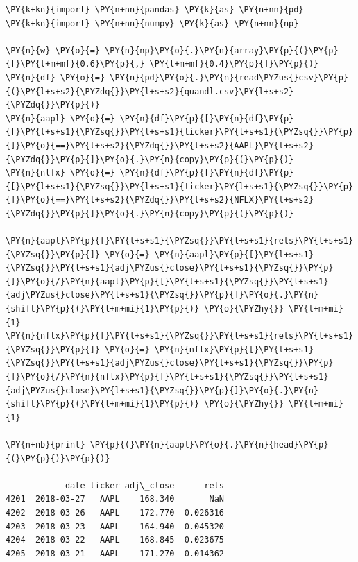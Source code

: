 \begin{tcolorbox}[breakable, size=fbox, boxrule=1pt, pad at break*=1mm,colback=cellbackground, colframe=cellborder]
\begin{Verbatim}[commandchars=\\\{\}]
\PY{k+kn}{import} \PY{n+nn}{pandas} \PY{k}{as} \PY{n+nn}{pd}
\PY{k+kn}{import} \PY{n+nn}{numpy} \PY{k}{as} \PY{n+nn}{np}

\PY{n}{w} \PY{o}{=} \PY{n}{np}\PY{o}{.}\PY{n}{array}\PY{p}{(}\PY{p}{[}\PY{l+m+mf}{0.6}\PY{p}{,} \PY{l+m+mf}{0.4}\PY{p}{]}\PY{p}{)}
\PY{n}{df} \PY{o}{=} \PY{n}{pd}\PY{o}{.}\PY{n}{read\PYZus{}csv}\PY{p}{(}\PY{l+s+s2}{\PYZdq{}}\PY{l+s+s2}{quandl.csv}\PY{l+s+s2}{\PYZdq{}}\PY{p}{)}
\PY{n}{aapl} \PY{o}{=} \PY{n}{df}\PY{p}{[}\PY{n}{df}\PY{p}{[}\PY{l+s+s1}{\PYZsq{}}\PY{l+s+s1}{ticker}\PY{l+s+s1}{\PYZsq{}}\PY{p}{]}\PY{o}{==}\PY{l+s+s2}{\PYZdq{}}\PY{l+s+s2}{AAPL}\PY{l+s+s2}{\PYZdq{}}\PY{p}{]}\PY{o}{.}\PY{n}{copy}\PY{p}{(}\PY{p}{)}
\PY{n}{nlfx} \PY{o}{=} \PY{n}{df}\PY{p}{[}\PY{n}{df}\PY{p}{[}\PY{l+s+s1}{\PYZsq{}}\PY{l+s+s1}{ticker}\PY{l+s+s1}{\PYZsq{}}\PY{p}{]}\PY{o}{==}\PY{l+s+s2}{\PYZdq{}}\PY{l+s+s2}{NFLX}\PY{l+s+s2}{\PYZdq{}}\PY{p}{]}\PY{o}{.}\PY{n}{copy}\PY{p}{(}\PY{p}{)}
		
\PY{n}{aapl}\PY{p}{[}\PY{l+s+s1}{\PYZsq{}}\PY{l+s+s1}{rets}\PY{l+s+s1}{\PYZsq{}}\PY{p}{]} \PY{o}{=} \PY{n}{aapl}\PY{p}{[}\PY{l+s+s1}{\PYZsq{}}\PY{l+s+s1}{adj\PYZus{}close}\PY{l+s+s1}{\PYZsq{}}\PY{p}{]}\PY{o}{/}\PY{n}{aapl}\PY{p}{[}\PY{l+s+s1}{\PYZsq{}}\PY{l+s+s1}{adj\PYZus{}close}\PY{l+s+s1}{\PYZsq{}}\PY{p}{]}\PY{o}{.}\PY{n}{shift}\PY{p}{(}\PY{l+m+mi}{1}\PY{p}{)} \PY{o}{\PYZhy{}} \PY{l+m+mi}{1}
\PY{n}{nflx}\PY{p}{[}\PY{l+s+s1}{\PYZsq{}}\PY{l+s+s1}{rets}\PY{l+s+s1}{\PYZsq{}}\PY{p}{]} \PY{o}{=} \PY{n}{nflx}\PY{p}{[}\PY{l+s+s1}{\PYZsq{}}\PY{l+s+s1}{adj\PYZus{}close}\PY{l+s+s1}{\PYZsq{}}\PY{p}{]}\PY{o}{/}\PY{n}{nflx}\PY{p}{[}\PY{l+s+s1}{\PYZsq{}}\PY{l+s+s1}{adj\PYZus{}close}\PY{l+s+s1}{\PYZsq{}}\PY{p}{]}\PY{o}{.}\PY{n}{shift}\PY{p}{(}\PY{l+m+mi}{1}\PY{p}{)} \PY{o}{\PYZhy{}} \PY{l+m+mi}{1}

\PY{n+nb}{print} \PY{p}{(}\PY{n}{aapl}\PY{o}{.}\PY{n}{head}\PY{p}{(}\PY{p}{)}\PY{p}{)}

            date ticker adj\_close      rets
4201  2018-03-27   AAPL    168.340       NaN
4202  2018-03-26   AAPL    172.770  0.026316
4203  2018-03-23   AAPL    164.940 -0.045320
4204  2018-03-22   AAPL    168.845  0.023675
4205  2018-03-21   AAPL    171.270  0.014362
\end{Verbatim}
\end{tcolorbox}

